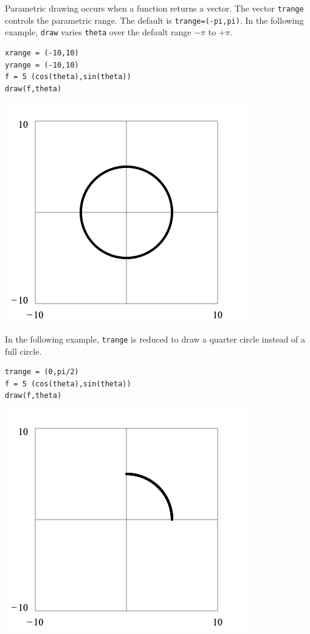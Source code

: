 \noindent
Parametric drawing occurs when a function returns a vector.
The vector \verb$trange$ controls the parametric range.
The default is \verb$trange=(-pi,pi)$.
In the following example, \verb$draw$ varies \verb$theta$
over the default range $-\pi$ to $+\pi$.

{\color{blue}
\begin{verbatim}
xrange = (-10,10)
yrange = (-10,10)
f = 5 (cos(theta),sin(theta))
draw(f,theta)
\end{verbatim}
}

\begin{center}
\includegraphics[scale=0.4]{circle1.png}
\end{center}

\noindent
In the following example, \verb$trange$ is reduced
to draw a quarter circle instead of a full circle.

{\color{blue}
\begin{verbatim}
trange = (0,pi/2)
f = 5 (cos(theta),sin(theta))
draw(f,theta)
\end{verbatim}
}

\begin{center}
\includegraphics[scale=0.4]{circle2.png}
\end{center}

